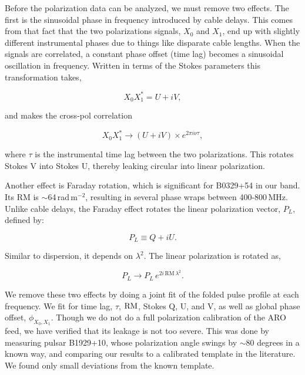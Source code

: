 Before the polarization data can be analyzed, 
we must remove two effects. The first is the 
sinusoidal phase in frequency introduced by cable delays. 
This comes from that fact that the two polarizations signals, 
$X_0$ and $X_1$, end up with slightly different instrumental 
phases due to things like disparate cable lengths. When 
the signals are correlated, a constant phase offset (time lag) 
becomes a sinusoidal oscillation in frequency. 
Written in terms of the Stokes parameters
this transformation takes,

\begin{equation}
X_0 X_1^* = U + iV,
\end{equation}

\noindent and makes the cross-pol correlation

\begin{equation}
X_0 X_1^* \rightarrow \left (U + iV \right) \times e^{2\pi i \nu \tau},
\end{equation}

\noindent where $\tau$ is the instrumental time lag
between the two polarizations. This rotates Stokes V 
into Stokes U, thereby leaking circular into linear polarization.

Another effect is Faraday rotation, which is significant 
for B0329+54 in our band. Its RM is $\sim$64\,rad\,m$^{-2}$, 
resulting in several phase wraps between 400-800\,MHz.
Unlike cable delays, the Faraday effect rotates the 
linear polarization vector, $P_L$, defined by:

\begin{equation}
P_L \equiv Q + iU.
\end{equation}

\noindent Similar to dispersion, it depends on $\lambda^2$.
The linear polarization is rotated as,

\begin{equation}
P_L \rightarrow P_L\, e^{2i\, \textrm{RM} \, \lambda^2}.
\end{equation}

We remove these two effects by doing a joint fit 
of the folded pulse profile at each frequency. We fit 
for time lag, $\tau$, $\rm RM$, Stokes 
Q, U, and V, as well as global phase offset, $\phi_{X_0,X_1}$. 
Though we do not do a full polarization calibration of 
the ARO feed, we have verified that its leakage is 
not too severe. This was done by measuring pulsar 
B1929+10, whose polarization angle swings by $\sim$80 
degrees in a known way, and comparing our results to a
calibrated template in the literature. We found 
only small deviations from the known template.

